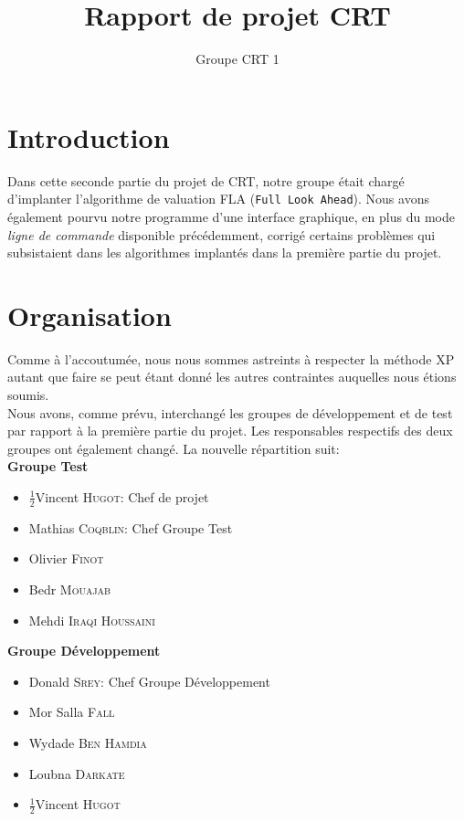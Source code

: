 \documentclass[a4paper,12pt]{article}
\author{Groupe CRT 1}
\title{Rapport de projet CRT}
\def\familyname{\textsc}
\def\firstname#1{#1}
\def\groupmember#1#2{\firstname{#1} \familyname{#2}}
\def\mwyd{\groupmember{Wydade}{Ben Hamdia}}
\def\mmat{\groupmember{Mathias}{Coqblin}}
\def\mlou{\groupmember{Loubna}{Darkate}}
\def\mmor{\groupmember{Mor Salla}{Fall}}
\def\moli{\groupmember{Olivier}{Finot}}
\def\mvin{\groupmember{Vincent}{Hugot}}
\def\mmed{\groupmember{Mehdi}{Iraqi Houssaini}}
\def\mbed{\groupmember{Bedr}{Mouajab}}
\def\mdon{\groupmember{Donald}{Srey}}
\def\grpd{Groupe Développement}
\def\grpt{Groupe Test}
\begin{document}
 
\maketitle

\tableofcontents



\section{Introduction}

Dans cette seconde partie du projet de CRT, notre groupe était
chargé d'implanter l'algorithme de valuation FLA (\texttt{Full Look Ahead}).
Nous avons également pourvu notre programme d'une interface graphique,
en plus du mode \emph{ligne de commande} disponible précédemment,
corrigé certains problèmes qui subsistaient dans
les algorithmes implantés dans la première partie du
projet.

\section{Organisation}

Comme à l'accoutumée, nous nous sommes astreints à respecter la
méthode XP autant que faire se peut étant donné les autres contraintes
auquelles nous étions soumis.\mk\\
%
Nous avons, comme prévu, interchangé les groupes de développement et 
de test par rapport à la première partie du projet. 
Les responsables respectifs des deux groupes ont également changé.
La nouvelle répartition suit:\mk\\
%
\textbf{\grpt}
\begin{itemize}
\item $\frac12$\mvin : Chef de projet
\item \mmat : Chef \grpt
\item \moli
\item \mbed
\item \mmed \mk\\
\end{itemize}

\textbf{\grpd}
\begin{itemize}
\item \mdon : Chef \grpd
\item \mmor
\item \mwyd 
\item \mlou
\item $\frac12$\mvin 
\end{itemize}
\end{document}
